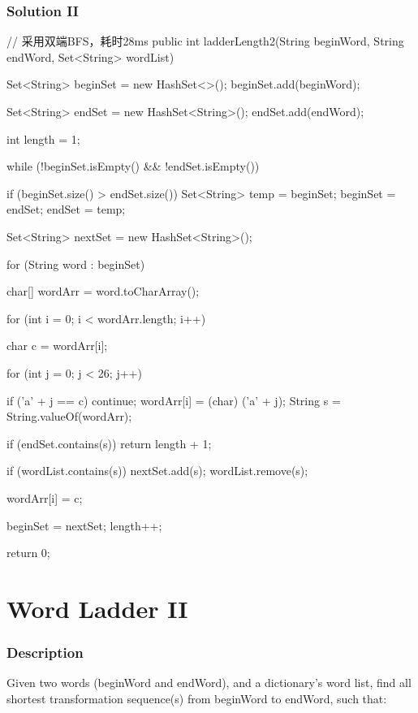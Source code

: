 \newpage

\subsubsection{Solution II}

\begin{Code}
// 采用双端BFS，耗时28ms
public int ladderLength2(String beginWord, String endWord, Set<String> wordList) {
    Set<String> beginSet = new HashSet<>();
    beginSet.add(beginWord);

    Set<String> endSet = new HashSet<String>();
    endSet.add(endWord);

    int length = 1;

    while (!beginSet.isEmpty() && !endSet.isEmpty()) {
        if (beginSet.size() > endSet.size()) {
            Set<String> temp = beginSet;
            beginSet = endSet;
            endSet = temp;
        }

        Set<String> nextSet = new HashSet<String>();

        for (String word : beginSet) {
            char[] wordArr = word.toCharArray();

            for (int i = 0; i < wordArr.length; i++) {
                char c = wordArr[i];

                for (int j = 0; j < 26; j++) {
                    if ('a' + j == c) {
                        continue;
                    }
                    wordArr[i] = (char) ('a' + j);
                    String s = String.valueOf(wordArr);

                    if (endSet.contains(s)) {
                        return length + 1;
                    }

                    if (wordList.contains(s)) {
                        nextSet.add(s);
                        wordList.remove(s);
                    }
                }
                wordArr[i] = c;
            }
        }

        beginSet = nextSet;
        length++;
    }

    return 0;
}
\end{Code}

\newpage

\section{Word Ladder II} %

\subsubsection{Description}
Given two words (beginWord and endWord), and a dictionary's word list, find all shortest transformation sequence(s) from beginWord to endWord, such that:

